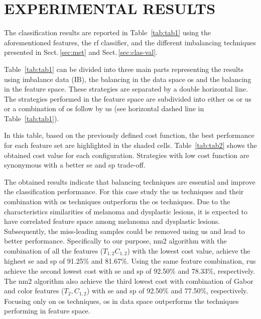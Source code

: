 \graphicspath{ {./content/Experiments-results/figures/} }

\section{\uppercase{Experimental Results}}
\label{sec:exp-res} 

\noindent The classification results are reported in Table~\ref{tab:tab1} using the aforementioned features, the \ac{rf} classifier, and the different imbalancing techniques presented in Sect.\,\ref{sec:met} and Sect.\,\ref{sec:clas-val}. 

Table~\ref{tab:tab1} can be divided into three main parts representing the results using imbalance data (IB), the balancing in the data space \ac{os} and the balancing in the feature space.
These strategies are separated by a double horizontal line.
The strategies performed in the feature space are subdivided into either \ac{os} or \ac{us} or a combination of \ac{os} follow by \ac{us} (see horizontal dashed line in Table~\ref{tab:tab1}).

In this table, based on the previously defined cost function, the best performance for each feature set are highlighted in the shaded cells.
Table~\ref{tab:tab2} shows the obtained cost value for each configuration. 
Strategies with low cost function are synonymous with a better \ac{se} and \ac{sp} trade-off.

The obtained results indicate that balancing techniques are essential and improve the classification performance. 
For this case study the \ac{us} techniques and their combination with \ac{os} techniques outperform the \ac{os} techniques. 
Due to the characteristics similarities of melanoma and dysplastic lesions, it is expected to have correlated feature space among melanoma and dysplastic lesions. 
Subsequently, the miss-leading samples could be removed using \ac{us} and lead to better performance.
Specifically to our purpose, \ac{nm2} algorithm with the combination of all the features ($T_{1,2} C_{1,2}$) with the lowest cost value, achieve the highest \ac{se} and \ac{sp} of 91.25\% and 81.67\%. 
Using the same feature combination, \ac{rus} achieve the second lowest cost with \ac{se} and \ac{sp} of 92.50\% and 78.33\%, respectively. 
The \ac{nm2} algorithm also achieve the third lowest cost with combination of Gabor and color features ($T_{2}, C_{1,2}$) with \ac{se} and \ac{sp} of 92.50\% and 77.50\%, respectively.  
Focusing only on \ac{os} techniques, \ac{os} in data space outperforms the techniques performing in feature space.


